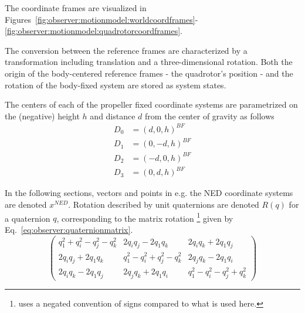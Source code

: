         The coordinate frames are visualized in Figures~\ref{fig:observer:motionmodel:worldcoordframes}-\ref{fig:observer:motionmodel:quadrotorcoordframes}.

        The conversion between the reference frames are characterized by a
        transformation including translation and a three-dimensional rotation.
        Both the origin of the body-centered reference frames
        - the quadrotor's position - and the rotation of the body-fixed
        system are stored as system states.

        The centers of each of the propeller fixed coordinate systems
        are parametrized on the (negative) height $h$ and distance $d$ from the center of
        gravity as follows
        \begin{align}
            D_{0} &= (d, 0, h)^{BF} \\
            D_{1} &= (0, -d, h)^{BF} \\
            D_{2} &= (-d, 0, h)^{BF} \\
            D_{3} &= (0, d, h)^{BF}
        \end{align}

        In the following sections, vectors and points in e.g. the NED
        coordinate systems are denoted $x^{NED}$.
        Rotation described by unit quaternions are denoted $R(q)$ for
        a quaternion $q$, corresponding to the matrix rotation
        \citep{kuipers2002quaternions}\footnote{\citep{kuipers2002quaternions} uses a negated convention of signs compared to what is used here.}
        given by Eq.~\eqref{eq:observer:quaternionmatrix}.
        \begin{equation}
            \label{eq:observer:quaternionmatrix}
            \left(
            \begin{array}{cccc}
                q_{1}^{2} + q_{i}^{2} - q_{j}^{2} - q_{k}^{2}   & 2q_{i}q_{j}-2q_{1}q_{k}                       & 2q_{i}q_{k} + 2q_{1}q_{j} \\
                2q_{i}q_{j} + 2q_{1}q_{k}                       & q_{1}^{2} - q_{i}^{2} + q_{j}^{2} - q_{k}^{2} & 2q_{j}q_{k} - 2q_{1}q_{i} \\
                2q_{i}q_{k} - 2q_{1}q_{j}                       & 2q_{j}q_{k} + 2q_{1}q_{i}                     & q_{1}^{2} - q_{i}^{2} - q_{j}^{2} + q_{k}^{2}
            \end{array}
            \right)
        \end{equation}

